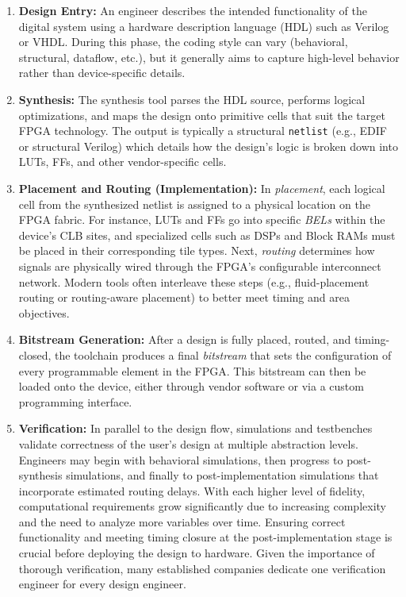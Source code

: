 \begin{enumerate}
\item \textbf{Design Entry:} 
    An engineer describes the intended functionality of the digital system using a hardware description language (HDL) such as Verilog or VHDL. 
    During this phase, the coding style can vary (behavioral, structural, dataflow, etc.), but it generally aims to capture high-level behavior rather than device-specific details.

\item \textbf{Synthesis:} 
    The synthesis tool parses the HDL source, performs logical optimizations, and maps the design onto primitive cells that suit the target FPGA technology. 
    The output is typically a structural \texttt{netlist} (e.g., EDIF or structural Verilog) which details how the design’s logic is broken down into LUTs, FFs, and other vendor-specific cells.

\item \textbf{Placement and Routing (Implementation):} 
    In \emph{placement}, each logical cell from the synthesized netlist is assigned to a physical location on the FPGA fabric. 
    For instance, LUTs and FFs go into specific \emph{BELs} within the device’s CLB sites, and specialized cells such as DSPs and Block RAMs must be placed in their corresponding tile types. 
    Next, \emph{routing} determines how signals are physically wired through the FPGA’s configurable interconnect network. 
    Modern tools often interleave these steps (e.g., fluid-placement routing or routing-aware placement) to better meet timing and area objectives.

\item \textbf{Bitstream Generation:} 
    After a design is fully placed, routed, and timing-closed, the toolchain produces a final \emph{bitstream} that sets the configuration of every programmable element in the FPGA. 
    This bitstream can then be loaded onto the device, either through vendor software or via a custom programming interface.

\item \textbf{Verification:} 
    In parallel to the design flow, simulations and testbenches validate correctness of the user's design at multiple abstraction levels. 
    Engineers may begin with behavioral simulations, then progress to post-synthesis simulations, and finally to post-implementation simulations that incorporate estimated routing delays. 
    With each higher level of fidelity, computational requirements grow significantly due to increasing complexity and the need to analyze more variables over time. 
    Ensuring correct functionality and meeting timing closure at the post-implementation stage is crucial before deploying the design to hardware. 
    Given the importance of thorough verification, many established companies dedicate one verification engineer for every design engineer.
\end{enumerate}


